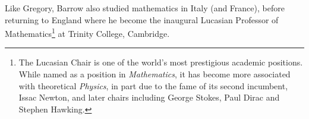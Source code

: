 Like Gregory, Barrow also studied mathematics in Italy (and France), before returning to England where he become the inaugural Lucasian Professor of Mathematics\footnote{%
	The Lucasian Chair is one of the world's most prestigious academic positions. While named as a position in \emph{Mathematics}, it has become more associated with theoretical \emph{Physics}, in part due to the fame of its second incumbent, Issac Newton, and later chairs including George Stokes, Paul Dirac and Stephen Hawking.%
}
at Trinity College, Cambridge.
\par



